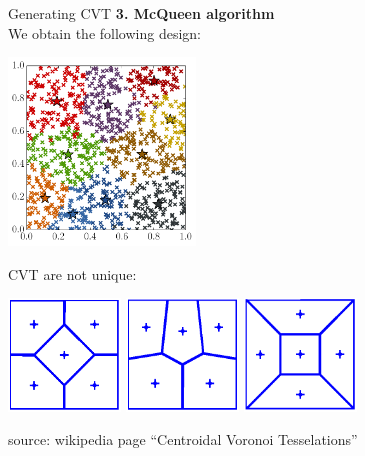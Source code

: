 \begin{frame}{Generating CVT }
\textbf{3. McQueen algorithm}\\
We obtain the following design:
\begin{center}
\includegraphics[height=5cm]{2_Design_of_experiments/figures/python/spf_McQueen}
\end{center}
\end{frame}

\begin{frame}{}
CVT are not unique:
\begin{center}
\includegraphics[height=3cm]{2_Design_of_experiments/figures/CVT1} \qquad
\includegraphics[height=3cm]{2_Design_of_experiments/figures/CVT2} \qquad
\includegraphics[height=3cm]{2_Design_of_experiments/figures/CVT3}
\end{center}
 source: wikipedia page ``Centroidal Voronoi Tesselations''
\end{frame}

